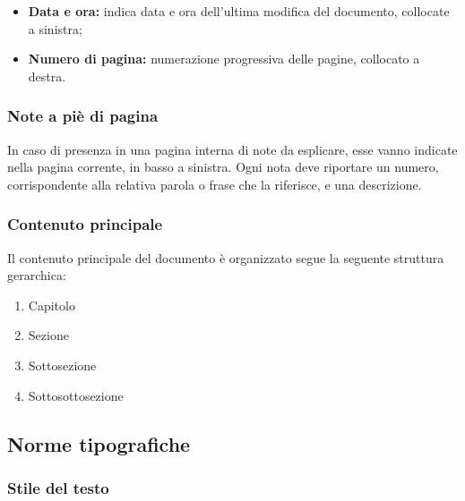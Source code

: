 \documentclass[../NormediProgetto.tex]{subfiles}
\begin{document}
\begin{itemize}
    \item \textbf{Data e ora:} indica data e ora dell'ultima modifica del documento, collocate a sinistra;
    \item \textbf{Numero di pagina:} numerazione progressiva delle pagine, collocato a destra.
\end{itemize}

\subsubsection{Note a piè di pagina}

In caso di presenza in una pagina interna di note da esplicare, esse vanno indicate nella pagina corrente, in basso a sinistra. Ogni nota deve riportare un numero, corrispondente alla relativa parola o frase che la riferisce, e una descrizione.

\subsubsection{Contenuto principale}

Il contenuto principale del documento è organizzato segue la seguente struttura gerarchica:

\begin{enumerate}
    \item Capitolo
    \item Sezione
    \item Sottosezione
    \item Sottosottosezione
\end{enumerate}

\subsection{Norme tipografiche}

\subsubsection{Stile del testo}
\end{document}
